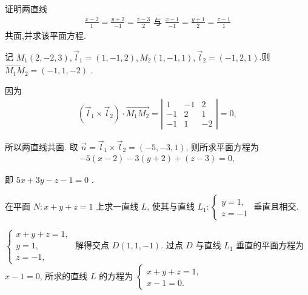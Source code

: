 \begin{exercise}
	证明两直线
	\begin{align*}
		\frac{x-2}{1}=\frac{y+2}{-1}=\frac{z-3}{2} \text { 与 } \frac{x-1}{-1}=\frac{y+1}{2}=\frac{z-1}{1}
	\end{align*}
	共面,并求该平面方程.
\end{exercise}
\begin{solution}
	记 $M_1(2,-2,3), \vec{l}_1=(1,-1,2), M_2(1,-1,1), \vec{l}_2=(-1,2,1)$.则 $\overrightarrow{M_1 M_2}=(-1,1,-2)$ .

	因为
	\begin{align*}
		\left(\vec{l}_1 \times \vec{l}_2\right) \cdot \overrightarrow{M_1 M_2}=\left|\begin{array}{ccc}
			                                                                             1  & -1 & 2  \\
			                                                                             -1 & 2  & 1  \\
			                                                                             -1 & 1  & -2
		                                                                             \end{array}\right|=0,
	\end{align*}

	所以两直线共面.
	取 $\vec{n}=\vec{l}_1 \times \vec{l}_2=(-5,-3,1)$, 则所求平面方程为
	\begin{align*}
		-5(x-2)-3(y+2)+(z-3)=0,
	\end{align*}

	即 $5 x+3 y-z-1=0$ .
\end{solution}

\begin{exercise}
	在平面 $N: x+y+z=1$ 上求一直线 $L$, 使其与直线 $L_1:\left\{\begin{array}{l}y=1, \\ z=-1\end{array}\right.$ 垂直且相交.
\end{exercise}
\begin{solution}
	$\left\{\begin{array}{l}x+y+z=1, \\ y=1, \\ z=-1,\end{array}\right.$ 解得交点 $D(1,1,-1)$.
	过点 $D$ 与直线 $L_1$ 垂直的平面方程为 $x-1=0$, 所求的直线 $L$ 的方程为 $\left\{\begin{array}{l}x+y+z=1, \\ x-1=0 .\end{array}\right.$
\end{solution}

